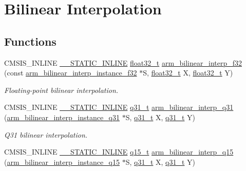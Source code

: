 \hypertarget{group___bilinear_interpolate}{}\section{Bilinear Interpolation}
\label{group___bilinear_interpolate}
\subsection*{Functions}
\begin{DoxyCompactItemize}
\item 
C\+M\+S\+I\+S\+\_\+\+I\+N\+L\+I\+NE \mbox{\hyperlink{cmsis__iccarm_8h_aba87361bfad2ae52cfe2f40c1a1dbf9c}{\+\_\+\+\_\+\+S\+T\+A\+T\+I\+C\+\_\+\+I\+N\+L\+I\+NE}} \mbox{\hyperlink{arm__math_8h_a4611b605e45ab401f02cab15c5e38715}{float32\+\_\+t}} \mbox{\hyperlink{group___bilinear_interpolate_gaba67d2ba2acbd428832f106de29b8627}{arm\+\_\+bilinear\+\_\+interp\+\_\+f32}} (const \mbox{\hyperlink{structarm__bilinear__interp__instance__f32}{arm\+\_\+bilinear\+\_\+interp\+\_\+instance\+\_\+f32}} $\ast$S, \mbox{\hyperlink{arm__math_8h_a4611b605e45ab401f02cab15c5e38715}{float32\+\_\+t}} X, \mbox{\hyperlink{arm__math_8h_a4611b605e45ab401f02cab15c5e38715}{float32\+\_\+t}} Y)
\begin{DoxyCompactList}\small\item\em Floating-\/point bilinear interpolation. \end{DoxyCompactList}\item 
C\+M\+S\+I\+S\+\_\+\+I\+N\+L\+I\+NE \mbox{\hyperlink{cmsis__iccarm_8h_aba87361bfad2ae52cfe2f40c1a1dbf9c}{\+\_\+\+\_\+\+S\+T\+A\+T\+I\+C\+\_\+\+I\+N\+L\+I\+NE}} \mbox{\hyperlink{arm__math_8h_adc89a3547f5324b7b3b95adec3806bc0}{q31\+\_\+t}} \mbox{\hyperlink{group___bilinear_interpolate_ga79d374eda5d39e220b0423ba3cb90c6e}{arm\+\_\+bilinear\+\_\+interp\+\_\+q31}} (\mbox{\hyperlink{structarm__bilinear__interp__instance__q31}{arm\+\_\+bilinear\+\_\+interp\+\_\+instance\+\_\+q31}} $\ast$S, \mbox{\hyperlink{arm__math_8h_adc89a3547f5324b7b3b95adec3806bc0}{q31\+\_\+t}} X, \mbox{\hyperlink{arm__math_8h_adc89a3547f5324b7b3b95adec3806bc0}{q31\+\_\+t}} Y)
\begin{DoxyCompactList}\small\item\em Q31 bilinear interpolation. \end{DoxyCompactList}\item 
C\+M\+S\+I\+S\+\_\+\+I\+N\+L\+I\+NE \mbox{\hyperlink{cmsis__iccarm_8h_aba87361bfad2ae52cfe2f40c1a1dbf9c}{\+\_\+\+\_\+\+S\+T\+A\+T\+I\+C\+\_\+\+I\+N\+L\+I\+NE}} \mbox{\hyperlink{arm__math_8h_ab5a8fb21a5b3b983d5f54f31614052ea}{q15\+\_\+t}} \mbox{\hyperlink{group___bilinear_interpolate_ga5f9b61bcae6d9295d926810cf398dd53}{arm\+\_\+bilinear\+\_\+interp\+\_\+q15}} (\mbox{\hyperlink{structarm__bilinear__interp__instance__q15}{arm\+\_\+bilinear\+\_\+interp\+\_\+instance\+\_\+q15}} $\ast$S, \mbox{\hyperlink{arm__math_8h_adc89a3547f5324b7b3b95adec3806bc0}{q31\+\_\+t}} X, \mbox{\hyperlink{arm__math_8h_adc89a3547f5324b7b3b95adec3806bc0}{q31\+\_\+t}} Y)

\end{DoxyCompactItemize}
